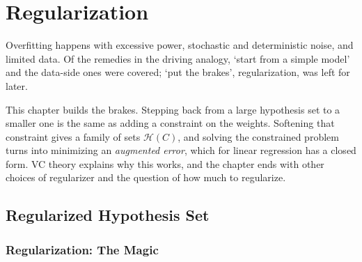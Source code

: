 \chapter{Regularization}

\begin{prev}
    Overfitting happens with excessive power, stochastic and deterministic
    noise, and limited data. Of the remedies in the driving analogy, `start
    from a simple model' and the data-side ones were covered; `put the brakes',
    regularization, was left for later.
\end{prev}

This chapter builds the brakes. Stepping back from a large hypothesis set to a
smaller one is the same as adding a constraint on the weights. Softening that
constraint gives a family of sets \(\mathcal{H}(C)\), and solving the
constrained problem turns into minimizing an \emph{augmented error}, which for
linear regression has a closed form. VC theory explains why this works, and
the chapter ends with other choices of regularizer and the question of how
much to regularize.

\section{Regularized Hypothesis Set}\label{sec:reg-hyp-set}


\subsection{Regularization: The Magic}

\begin{center}
\end{center}

